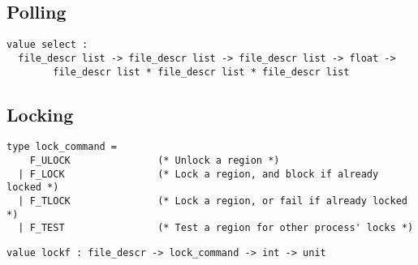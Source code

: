 \subsection*{Polling }\begin{verbatim}
value select :
  file_descr list -> file_descr list -> file_descr list -> float ->
        file_descr list * file_descr list * file_descr list
\end{verbatim}
%
\begin{comment}
 Wait until some input/output operations become possible on
           some channels. The three list arguments are, respectively, a set
           of descriptors to check for reading (first argument), for writing
           (second argument), or for exceptional conditions (third argument).
           The fourth argument is the maximal timeout, in seconds; a
           negative fourth argument means no timeout (unbounded wait).
           The result is composed of three sets of descriptors: those ready
           for reading (first component), ready for writing (second component),
           and over which an exceptional condition is pending (third
           component). 
\end{comment}
\subsection*{Locking }\begin{verbatim}
type lock_command =
    F_ULOCK               (* Unlock a region *)
  | F_LOCK                (* Lock a region, and block if already locked *)
  | F_TLOCK               (* Lock a region, or fail if already locked *)
  | F_TEST                (* Test a region for other process' locks *)
\end{verbatim}
\begin{comment}
 Commands for \verblockf. 
\end{comment}
\begin{verbatim}
value lockf : file_descr -> lock_command -> int -> unit
\end{verbatim}
%
\begin{comment}
 \verblockf fd cmd size puts a lock on a region of the file opened
           as \verbfd. The region starts at the current read/write position for
           \verbfd (as set by \verblseek), and extends \verbsize bytes forward if
           \verbsize is positive, \verbsize bytes backwards if \verbsize is negative,
           or to the end of the file if \verbsize is zero. 
\end{comment}
